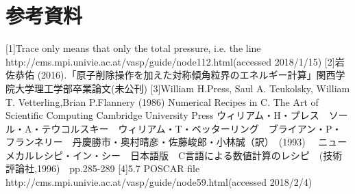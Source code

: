 \chapter{参考資料}\label{ux53c2ux8003ux8cc7ux6599}

{[}1{]}Trace only means that only the total pressure, i.e. the line
http://cms.mpi.univie.ac.at/vasp/guide/node112.html(accessed 2018/1/15)
 {[}2{]}岩佐恭佑
(2016).「原子削除操作を加えた対称傾角粒界のエネルギー計算」関西学院大学理工学部卒業論文(未公刊)
{[}3{]}William H.Press, Saul A. Teukolsky, William T. Vetterling,Brian
P.Flannery (1986) Numerical Recipes in C. The Art of Scientific
Computing Cambridge University Press
ウィリアム・H・プレス　ソール・A・テウコルスキー　ウィリアム・T・ベッターリング　ブライアン・P・フランネリー　丹慶勝市・奥村晴彦・佐藤峻郎・小林誠（訳）　(1993)　
ニューメカルレシピ・イン・シー　日本語版　C言語による数値計算のレシピ　(技術評論社,1996)　pp.285-289
{[}4{]}5.7 POSCAR file
http://cms.mpi.univie.ac.at/vasp/guide/node59.html(accessed 2018/2/4)


    
    
    
    
